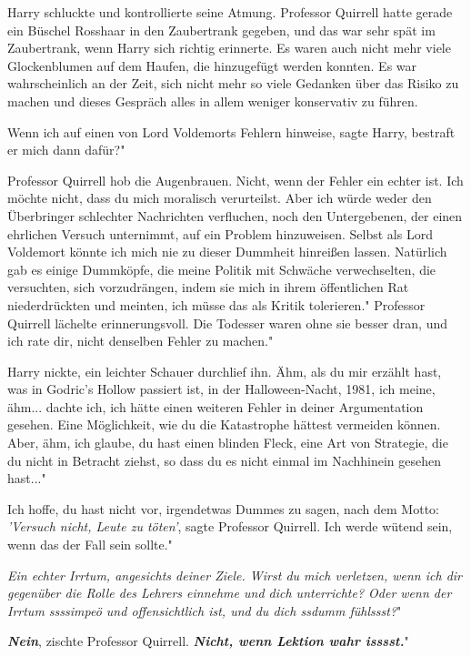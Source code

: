Harry schluckte und kontrollierte seine Atmung. Professor Quirrell hatte gerade
ein Büschel Rosshaar in den Zaubertrank gegeben, und das war sehr spät im
Zaubertrank, wenn Harry sich richtig erinnerte. Es waren auch nicht mehr viele
Glockenblumen auf dem Haufen, die hinzugefügt werden konnten. Es war
wahrscheinlich an der Zeit, sich nicht mehr so viele Gedanken über das Risiko zu
machen und dieses Gespräch alles in allem weniger konservativ zu führen.

\glqq{}Wenn ich auf einen von Lord Voldemorts Fehlern hinweise\grqq{}, sagte
Harry, \glqq{}bestraft er mich dann dafür?"

Professor Quirrell hob die Augenbrauen. \glqq{}Nicht, wenn der Fehler ein echter
ist. Ich möchte nicht, dass du mich moralisch verurteilst. Aber ich würde weder
den Überbringer schlechter Nachrichten verfluchen, noch den Untergebenen, der
einen ehrlichen Versuch unternimmt, auf ein Problem hinzuweisen. Selbst als Lord
Voldemort könnte ich mich nie zu dieser Dummheit hinreißen lassen. Natürlich gab
es einige Dummköpfe, die meine Politik mit Schwäche verwechselten, die
versuchten, sich vorzudrängen, indem sie mich in ihrem öffentlichen Rat
niederdrückten und meinten, ich müsse das als Kritik tolerieren." Professor
Quirrell lächelte erinnerungsvoll. \glqq{}Die Todesser waren ohne sie besser
dran, und ich rate dir, nicht denselben Fehler zu machen."

Harry nickte, ein leichter Schauer durchlief ihn. \glqq{}Ähm, als du mir erzählt
hast, was in Godric's Hollow passiert ist, in der Halloween-Nacht, 1981, ich
meine, ähm... dachte ich, ich hätte einen weiteren Fehler in deiner
Argumentation gesehen. Eine Möglichkeit, wie du die Katastrophe hättest
vermeiden können. Aber, ähm, ich glaube, du hast einen blinden Fleck, eine Art
von Strategie, die du nicht in Betracht ziehst, so dass du es nicht einmal im
Nachhinein gesehen hast..."

\glqq{}Ich hoffe, du hast nicht vor, irgendetwas Dummes zu sagen, nach dem Motto:
\emph{'Versuch nicht, Leute zu töten'}\grqq{}, sagte Professor Quirrell. \glqq
Ich werde wütend sein, wenn das der Fall sein sollte."

\glqq{}\emph{Ein echter Irrtum, angesichts deiner Ziele. Wirst du mich verletzen,
wenn ich dir gegenüber die Rolle des Lehrers einnehme und dich unterrichte? Oder
wenn der Irrtum ssssimpeö und offensichtlich ist, und du dich ssdumm fühlssst?}"

\glqq{}\textbf{\emph{Nein}}\grqq{}, zischte Professor Quirrell. \glqq
\textbf{\emph{Nicht, wenn Lektion wahr isssst.}}"

